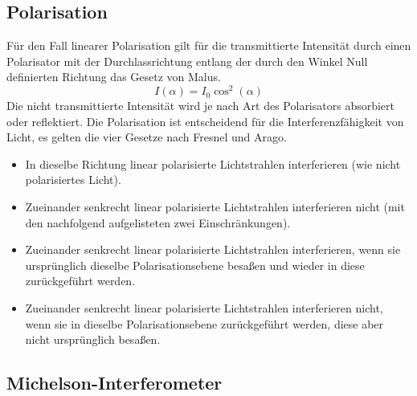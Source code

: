 \documentclass[ngerman]{scrartcl}
\begin{document}
\subsection{Polarisation}
\label{sec:grundlagen_polarisation}

Für den Fall linearer Polarisation gilt für die transmittierte Intensität durch einen Polarisator mit der Durchlassrichtung entlang der durch den Winkel Null definierten Richtung das Gesetz von Malus.
\begin{equation}
    I(\alpha) = I_0 \cos^2(\alpha)
\end{equation}
Die nicht transmittierte Intensität wird je nach Art des Polarisators absorbiert oder reflektiert. Die Polarisation ist entscheidend für die Interferenzfähigkeit von Licht, es gelten die vier Gesetze nach Fresnel und Arago.
\begin{framed}
    \begin{itemize}
        \item In dieselbe Richtung linear polarisierte Lichtstrahlen interferieren (wie nicht polarisiertes Licht).
        \item Zueinander senkrecht linear polarisierte Lichtstrahlen interferieren nicht (mit den nachfolgend aufgelisteten zwei Einschränkungen).
        \item Zueinander senkrecht linear polarisierte Lichtstrahlen interferieren, wenn sie ursprünglich dieselbe Polarisationsebene besaßen und wieder in diese zurückgeführt werden.
        \item  Zueinander senkrecht linear polarisierte Lichtstrahlen interferieren nicht, wenn sie in dieselbe Polarisationsebene zurückgeführt werden, diese aber nicht ursprünglich besaßen.
    \end{itemize}
\end{framed}

\subsection{Michelson-Interferometer}
\label{sec:grundlagen_michelson_interferometer}
\end{document}
